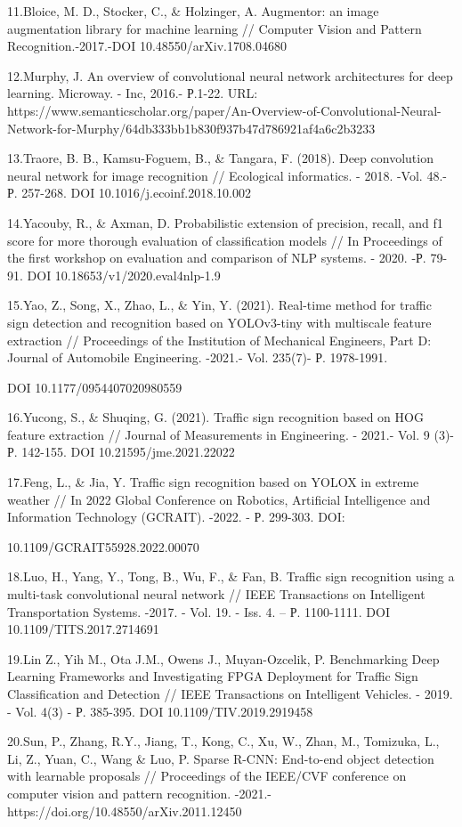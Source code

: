 \begin{noparindent}
11.Bloice, M. D., Stocker, C., \& Holzinger, A. Augmentor: an image
augmentation library for machine learning // Computer Vision and Pattern
Recognition.-2017.-DOI 10.48550/arXiv.1708.04680

12.Murphy, J. An overview of convolutional neural network architectures
for deep learning. Microway. - Inc, 2016.- Р.1-22. URL:
https://www.semanticscholar.org/paper/An-Overview-of-Convolutional-Neural-Network-for-Murphy/64db333bb1b830f937b47d786921af4a6c2b3233

13.Traore, B. B., Kamsu-Foguem, B., \& Tangara, F. (2018). Deep
convolution neural network for image recognition // Ecological
informatics. - 2018. -Vol. 48.- Р. 257-268. DOI
10.1016/j.ecoinf.2018.10.002

14.Yacouby, R., \& Axman, D. Probabilistic extension of precision,
recall, and f1 score for more thorough evaluation of classification
models // In Proceedings of the first workshop on evaluation and
comparison of NLP systems. - 2020. -Р. 79-91. DOI
10.18653/v1/2020.eval4nlp-1.9

15.Yao, Z., Song, X., Zhao, L., \& Yin, Y. (2021). Real-time method for
traffic sign detection and recognition based on YOLOv3-tiny with
multiscale feature extraction // Proceedings of the Institution of
Mechanical Engineers, Part D: Journal of Automobile Engineering. -2021.-
Vol. 235(7)- Р. 1978-1991.

DOI 10.1177/0954407020980559

16.Yucong, S., \& Shuqing, G. (2021). Traffic sign recognition based on
HOG feature extraction // Journal of Measurements in Engineering. -
2021.- Vol. 9 (3)-Р. 142-155. DOI 10.21595/jme.2021.22022

17.Feng, L., \& Jia, Y. Traffic sign recognition based on YOLOX in
extreme weather // In 2022 Global Conference on Robotics, Artificial
Intelligence and Information Technology (GCRAIT). -2022. - Р. 299-303.
DOI:

10.1109/GCRAIT55928.2022.00070

18.Luo, H., Yang, Y., Tong, B., Wu, F., \& Fan, B. Traffic sign
recognition using a multi-task convolutional neural network // IEEE
Transactions on Intelligent Transportation Systems. -2017. - Vol. 19. -
Iss. 4. -- Р. 1100-1111. DOI 10.1109/TITS.2017.2714691

19.Lin Z., Yih M., Ota J.M., Owens J., Muyan-Ozcelik, P. Benchmarking
Deep Learning Frameworks and Investigating FPGA Deployment for Traffic
Sign Classification and Detection // IEEE Transactions on Intelligent
Vehicles. - 2019. - Vol. 4(3) - Р. 385-395. DOI 10.1109/TIV.2019.2919458

20.Sun, P., Zhang, R.Y., Jiang, T., Kong, C., Xu, W., Zhan, M.,
Tomizuka, L., Li, Z., Yuan, C., Wang \& Luo, P. Sparse R-CNN: End-to-end
object detection with learnable proposals // Proceedings of the IEEE/CVF
conference on computer vision and pattern recognition. -2021.-
https://doi.org/10.48550/arXiv.2011.12450
\end{noparindent}

